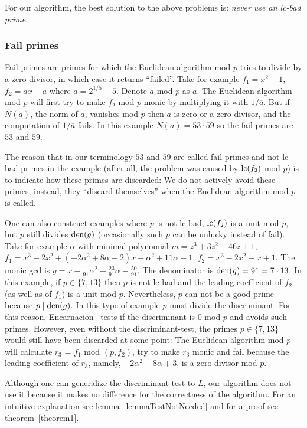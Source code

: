 \documentclass[10pt]{article}
\newcommand{\bad}{lc-bad }
\newcommand{\bbad}{lc-bad}
\begin{document}
For our algorithm, the best solution to the above problems is:
{\em never use  an \bad prime}.

\subsubsection{Fail primes}
Fail primes are primes for which the Euclidean algorithm mod $p$
tries to divide by a zero divisor, in which case it returns ``failed''.
Take for example $f_1 = x^2-1$, $f_2 = ax-a$ where $a = {2}^{1/5} + 5$.
Denote $a$ mod $p$ as $\overline{a}$.
The Euclidean algorithm mod $p$ will first try to make $f_2$ mod $p$
monic by multiplying it with $1/\overline{a}$.
But if $N(a)$, the norm of $a$, vanishes mod $p$
then $\overline{a}$ is zero or a zero-divisor, and the computation of
$1/\overline{a}$ fails. In this example $N(a) = 53 \cdot 59$
so the fail primes are $53$ and $59$.

The reason that in our terminology $53$ and $59$ are called fail primes
and not \bad primes in the example (after all, the problem was caused
by ${\rm lc}(f_2)$ mod $p$)
is to indicate how these primes are discarded:
We do not actively avoid these primes, instead, they
``discard themselves'' when the Euclidean algorithm mod $p$ is called.

One can also construct examples where $p$ is not \bbad,
${\rm lc}(f_2)$ is a unit mod $p$,
but $p$ still divides ${\rm den}(g)$  (occasionally such $p$
can be unlucky instead of fail).
Take for example $\alpha$ with minimal polynomial $m = z^3+3z^2-46z+1$,
$f_1 = x^3-2x^2+(-2\alpha^2 + 8\alpha +2 )x - \alpha^2 + 11\alpha - 1$,
$f_2 = x^3-2x^2-x+1$.
The monic gcd is $g = x - \frac{1}{91}\alpha^2- \frac{23}{91}\alpha - \frac{50}{91}$.
The denominator is ${\rm den}(g) = 91 = 7 \cdot 13$.
In this example, if $p \in \{7,13\}$ then $p$ is not \bad and the leading
coefficient of $f_2$ (as well as of $f_1$) is a unit mod $p$.
Nevertheless, $p$ can not be a good prime because $p \mid {\rm den}(g)$.
In this type of example $p$ must divide the discriminant.
For this reason, Encarnacion~\cite{Encarnacion} tests if the
discriminant is $0$ mod $p$ and avoids such primes.
However, even without the discriminant-test,
the primes $p \in \{7,13\}$ would still have been discarded at some point:
The Euclidean algorithm mod $p$
will calculate $r_3$ = $f_1$ mod $(p,f_2)$, try to make $r_3$ monic
and fail because the leading coefficient of $r_3$,
namely, $-2\alpha^2+8 \alpha+3$, is a zero divisor mod $p$.


Although one can generalize the discriminant-test
to $L$, our algorithm does not use it because it makes no difference for
the correctness of the algorithm.
For an intuitive explanation see lemma~\ref{lemmaTestNotNeeded} and for a proof see theorem~\ref{theorem1}.
\end{document}
